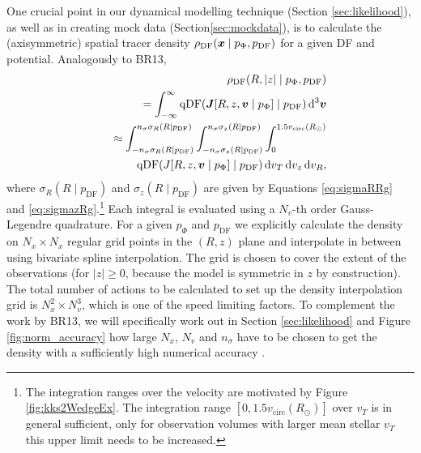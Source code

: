 One crucial point in our dynamical modelling technique (Section \ref{sec:likelihood}), as well as in creating mock data (Section\ref{sec:mockdata}), is to calculate the (axisymmetric) spatial tracer density $\rho_\text{DF}(\boldsymbol{x} \mid p_{\Phi},p_\text{DF})$ for a given DF and potential. Analogously to BR13, 
\begin{eqnarray}
&&\rho_\text{DF}(R,|z| \mid p_{\Phi},p_\text{DF}) \nonumber\\
&&= \int_{-\infty}^{\infty} \text{qDF}(\vect{J}[R,z,\vect{v} \mid p_{\Phi}] \mid p_\text{DF}) \Diff3\vect{v}  \\%
&&\approx \int_{-n_\sigma \sigma_R(R \mid p_\text{DF})}^{n_\sigma \sigma_R(R \mid p_\text{DF})} \int_{-n_\sigma\sigma_z(R \mid p_\text{DF})}^{n_\sigma \sigma_z(R \mid p_\text{DF})} \int_{0}^{1.5 v_\text{circ}(R_\odot)}  \nonumber\\
& & \hspace{1cm} \text{qDF}(J[R,z,\vect{v} \mid p_{\Phi}] \mid p_\text{DF}) \diff v_T \diff v_z \diff v_R, \label{eq:tracerdensity}
\end{eqnarray}
where $\sigma_R(R \mid p_\text{DF})$ and $\sigma_z(R \mid p_\text{DF})$ are given by Equations \ref{eq:sigmaRRg} and \ref{eq:sigmazRg}.\footnote{The integration ranges over the velocity are motivated by Figure \ref{fig:kks2WedgeEx}. The integration range $[0,1.5 v_\text{circ}(R_\odot)]$ over $v_T$ is in general sufficient, only for observation volumes with larger mean stellar $v_T$ this upper limit needs to be increased.} Each integral is evaluated using a $N_v$-th order Gauss-Legendre quadrature. For a given $p_\Phi$ and $p_\text{DF}$ we explicitly calculate the density on $N_x \times N_x$ regular grid points in the $(R,z)$ plane and interpolate in between using bivariate spline interpolation. The grid is chosen to cover the extent of the observations (for $|z|\geq0$, because the model is symmetric in $z$ by construction). The total number of actions to be calculated to set up the density interpolation grid is $N_x^2 \times N_v^3$, which is one of the speed limiting factors. To complement the work by BR13, we will specifically work out in Section \ref{sec:likelihood} and Figure \ref{fig:norm_accuracy} how large $N_x$, $N_v$ and $n_\sigma$ have to be chosen to get the density with a sufficiently high numerical accuracy . 


